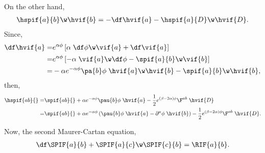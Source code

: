 On the other hand,
\begin{align}
  \hspif{a}{b}\w\hvif{b} = -\df\hvif{a} - \hspif{a}{D}\w\hvif{D}.
\end{align}
Since,
\begin{align}
  \df\hvif{a} 
  =& e^{\alpha\phi}\left[\alpha\;\df\phi\w\vif{a} +  \df\vif{a}\right]\nonumber\\
  =& e^{\alpha\phi}\left[-\alpha\;\vif{a}\w\df\phi -  \spif{a}{b}\w\vif{b}\right]\nonumber\\
  =& -\alpha e^{-\alpha\phi}\pa{b}\phi\;\hvif{a}\w\hvif{b} - \spif{a}{b}\w\hvif{b},
\end{align}
then,
\begin{align}
  \hspif{ab}{} =& \spif{ab}{} + \alpha e^{-\alpha\phi}\pau{b}\phi\;\hvif{a} - \frac{1}{2}e^{(\beta-2\alpha)\phi}\F^{a b}\;\hvif{D}\nonumber\\
  =& \spif{ab}{} + \alpha e^{-\alpha\phi}\left(\pau{b}\phi\;\hvif{a} - \partial^{a}\phi\;\hvif{b}\right) - \frac{1}{2}e^{(\beta-2\alpha)\phi}\F^{a b}\;\hvif{D}.
\end{align}

Now, the second Maurer-Cartan equation,
\begin{align}
  \df\SPIF{a}{b}+\SPIF{a}{c}\w\SPIF{c}{b}=\RIF{a}{b}.
\end{align}

